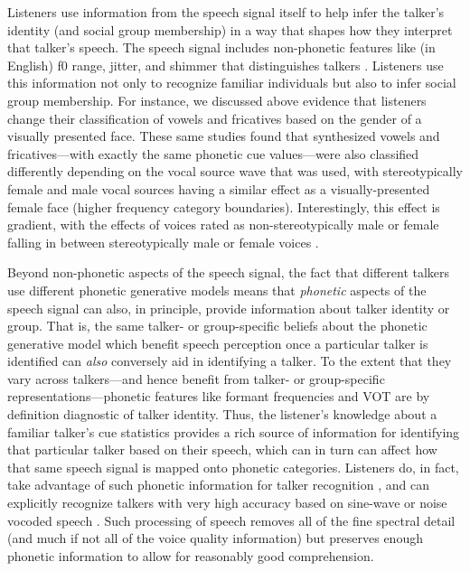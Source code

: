 Listeners use information from the speech signal itself to help infer the talker's identity (and social group membership) in a way that shapes how they interpret that talker's speech.  The speech signal includes non-phonetic features like (in English) f0 range, jitter, and shimmer that distinguishes talkers \cite{Creel2011,Pardo2006}.  Listeners use this information not only to recognize familiar individuals but also to infer social group membership.  For instance, we discussed above evidence that listeners change their classification of vowels and fricatives based on the gender of a visually presented face.  These same studies found that synthesized vowels and fricatives---with exactly the same phonetic cue values---were also classified differently depending on the vocal source wave that was used, with stereotypically female and male vocal sources having a similar effect as a visually-presented female face (higher frequency category boundaries).  Interestingly, this effect is gradient, with the effects of voices rated as non-stereotypically male or female falling in between stereotypically male or female voices \cite{Johnson1999,Munson2011a,Strand1996,Strand1999}.

Beyond non-phonetic aspects of the speech signal, the fact that different talkers use different phonetic generative models means that \emph{phonetic} aspects of the speech signal can also, in principle, provide information about talker identity or group.  That is, the same talker- or group-specific beliefs about the phonetic generative model which benefit speech perception once a particular talker is identified can \emph{also} conversely aid in identifying a talker.  To the extent that they vary across talkers---and hence benefit from talker- or group-specific representations---phonetic features like formant frequencies and VOT are by definition diagnostic of talker identity.  Thus, the listener's knowledge about a familiar talker's cue statistics provides a rich source of information for identifying that particular talker based on their speech, which can in turn can affect how that same speech signal is mapped onto phonetic categories.  Listeners do, in fact, take advantage of such phonetic information for talker recognition \cite{Creel2011,Pardo2006}, and can explicitly recognize talkers with very high accuracy based on sine-wave \cite{Remez1997} or noise vocoded speech \cite{Sheffert2002}.  Such processing of speech removes all of the fine spectral detail (and much if not all of the voice quality information) but preserves enough phonetic information to allow for reasonably good comprehension.

